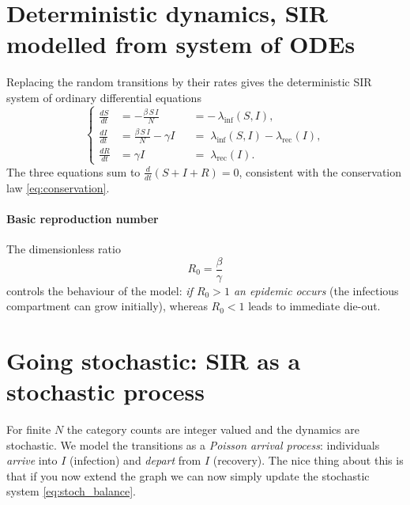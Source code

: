 \section{Deterministic dynamics, SIR modelled from system of ODEs}
\label{sec:ode}

Replacing the random transitions by their rates gives the deterministic SIR
system of ordinary differential equations
\begin{equation}
  \left\{
  \begin{aligned}
    \frac{dS}{dt} &= -\frac{\beta\,S\,I}{N}
                   &&= -\,\lambda_{\mathrm{inf}}(S,I),\\[4pt]
    \frac{dI}{dt} &= \frac{\beta\,S\,I}{N} - \gamma I
                   &&= \;\lambda_{\mathrm{inf}}(S,I) - \lambda_{\mathrm{rec}}(I),\\[4pt]
    \frac{dR}{dt} &= \gamma I
                   &&= \;\lambda_{\mathrm{rec}}(I).
  \end{aligned}
  \right.
  \label{eq:ode}
\end{equation}
The three equations sum to $\tfrac{d}{dt}(S+I+R)=0$, consistent with the
conservation law \eqref{eq:conservation}.
\newline
\paragraph{Basic reproduction number}
The dimensionless ratio
\begin{equation}
  R_0 = \frac{\beta}{\gamma}
  \label{eq:R0}
\end{equation}
controls the behaviour of the model: \emph{if $R_0 > 1$ an epidemic occurs}
(the infectious compartment can grow initially), whereas $R_0<1$ leads to
immediate die-out.

\section{Going stochastic: SIR as a stochastic process}

For finite $N$ the category counts are integer valued and the dynamics are
stochastic. We model the transitions as a \emph{Poisson arrival process}:
individuals \emph{arrive} into $I$ (infection) and \emph{depart} from $I$
(recovery). The nice thing about this is that if you now extend the graph we can now simply update the stochastic system \ref{eq:stoch_balance}.

\begin{center}
\end{center}

